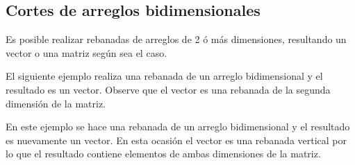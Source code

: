 \begin{Shaded}
\begin{Highlighting}[]
\OperatorTok{=}\NormalTok{ np.array([}\NormalTok{, }\NormalTok{, }\NormalTok{, }\NormalTok{, }\NormalTok{, }\NormalTok{, }\NormalTok{])}
    \NormalTok{(arreglo[}\NormalTok{:}\NormalTok{:}\NormalTok{])}
\end{Highlighting}
\end{Shaded}

\subsection{Cortes de arreglos bidimensionales}

Es posible realizar rebanadas de arreglos de 2 ó más dimensiones,
resultando un vector o una matriz según sea el caso.

El siguiente ejemplo realiza una rebanada de un arreglo bidimensional y
el resultado es un vector. Observe que el vector es una rebanada de la
segunda dimensión de la matriz.

\begin{Shaded}
\begin{Highlighting}[]
\OperatorTok{=}\NormalTok{ np.array([[}\NormalTok{, }\NormalTok{, }\NormalTok{, }\NormalTok{, }\NormalTok{], [}\NormalTok{, }\NormalTok{, }\NormalTok{, }\NormalTok{, }\NormalTok{]])}
    \NormalTok{(arreglo[}\NormalTok{, }\NormalTok{:}\NormalTok{])}
\end{Highlighting}
\end{Shaded}

En este ejemplo se hace una rebanada de un arreglo bidimensional y el
resultado es nuevamente un vector. En esta ocasión el vector es una
rebanada vertical por lo que el resultado contiene elementos de ambas
dimensiones de la matriz.

\begin{Shaded}
\begin{Highlighting}[]
\OperatorTok{=}\NormalTok{ np.array([[}\NormalTok{, }\NormalTok{, }\NormalTok{, }\NormalTok{, }\NormalTok{], [}\NormalTok{, }\NormalTok{, }\NormalTok{, }\NormalTok{, }\NormalTok{]])}
    \NormalTok{(arreglo[}\NormalTok{:}\NormalTok{, }\NormalTok{])}
\end{Highlighting}
\end{Shaded}


